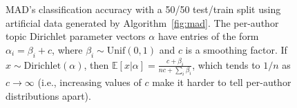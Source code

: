 \documentclass[14pt]{article} %
\theoremstyle{plain}
\theoremstyle{definition}
\theoremstyle{remark}
\begin{document}
\begin{figure}
\centering
{}
\caption{MAD's classification accuracy with a 50/50 test/train split using artificial data generated by Algorithm~\ref{fig:mad}. The per-author topic Dirichlet parameter vectors $\alpha$ have entries of the form $\alpha_i = \beta_i + c$, where $\beta_i \sim \text{Unif}(0,1)$ and $c$ is a smoothing factor. If $x\sim \text{Dirichlet}(\alpha)$, then $\mathbb{E}[x|\alpha] = \frac{c+\beta_{i}}{nc+\sum_{i}\beta_i}$, which tends to $1/n$ as $c\to\infty$ (i.e., increasing values of $c$ make it harder to tell per-author distributions apart). }
\label{fig:sanity check}
\end{figure}

\clearpage




\newpage
\end{document}
